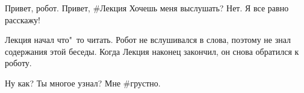 \begin{dialog}
\X Привет, робот.
\R Привет, \#Лекция
\X Хочешь меня выслушать?
\R Нет.
\X Я все равно расскажу!
\end{dialog}

\begin{monolog}
Лекция начал что"~то читать. Робот не вслушивался в слова, поэтому не знал содержания этой беседы. Когда Лекция наконец закончил, он снова обратился к роботу.
\end{monolog}

\begin{dialog}
\X Ну как? Ты многое узнал?
\R Мне \#грустно.
\end{dialog}